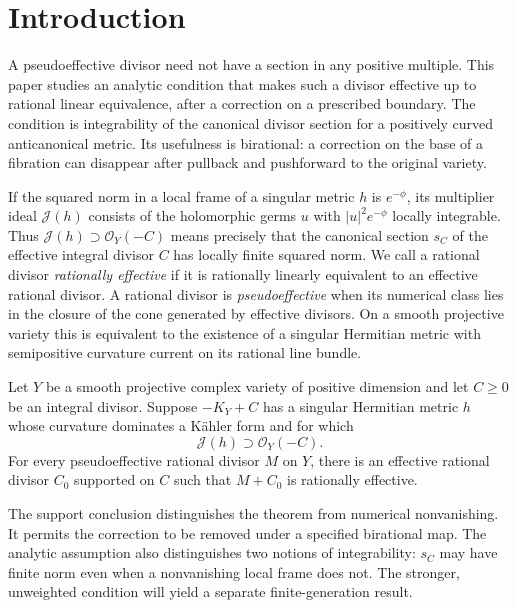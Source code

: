 \section{Introduction}

A pseudoeffective divisor need not have a section in any positive
multiple.  This paper studies an analytic condition that makes such a
divisor effective up to rational linear equivalence, after a correction
on a prescribed boundary.  The condition is integrability of the
canonical divisor section for a positively curved anticanonical metric.
Its usefulness is birational: a correction on the base of a fibration
can disappear after pullback and pushforward to the original variety.

If the squared norm in a local frame of a singular metric $h$ is
$e^{-\phi}$, its multiplier ideal $\mathcal J(h)$ consists of the
holomorphic germs $u$ with $|u|^2e^{-\phi}$ locally integrable.
Thus $\mathcal J(h)\supset\mathcal O_Y(-C)$ means precisely that
the canonical section $s_C$ of the effective integral divisor $C$
has locally finite squared norm.  We call a rational divisor
\emph{rationally effective} if it is rationally linearly equivalent
to an effective rational divisor.  A rational divisor is
\emph{pseudoeffective} when its numerical class lies in the closure
of the cone generated by effective divisors.  On a smooth projective
variety this is equivalent to the existence of a singular Hermitian
metric with semipositive curvature current on its rational line bundle.

\begin{theorem}
\label{thm:controlled-boundary}
Let $Y$ be a smooth projective complex variety of positive dimension
and let $C\ge0$ be an integral divisor.  Suppose $-K_Y+C$ has a
singular Hermitian metric $h$ whose curvature dominates a K\"ahler
form and for which
\[
 \mathcal J(h)\supset\mathcal O_Y(-C).
\]
For every pseudoeffective rational divisor $M$ on $Y$, there is an
effective rational divisor $C_0$ supported on $C$ such that
$M+C_0$ is rationally effective.
\end{theorem}

The support conclusion distinguishes the theorem from numerical
nonvanishing.  It permits the correction to be removed under a
specified birational map.  The analytic assumption also distinguishes
two notions of integrability: $s_C$ may have finite norm even when a
nonvanishing local frame does not.  The stronger, unweighted condition
will yield a separate finite-generation result.

